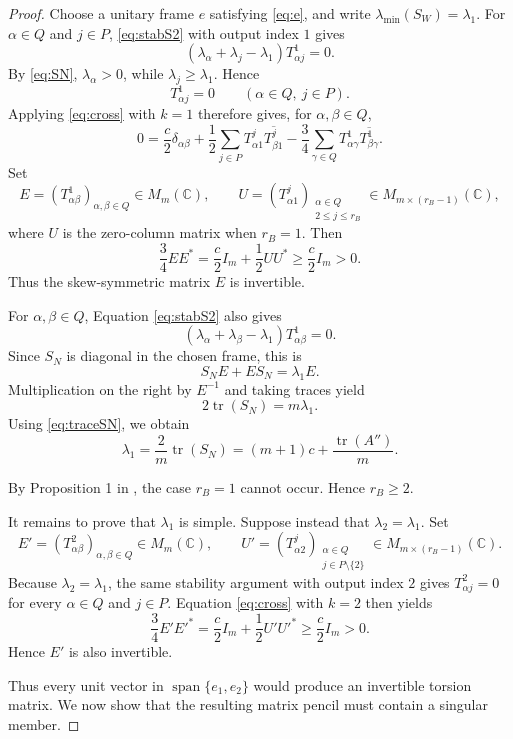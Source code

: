 \documentclass{amsart}
\newcommand{\C}{{\mathbb C}}
\begin{document}
\begin{proof}
Choose a unitary frame $e$ satisfying  \eqref{eq:e}, and write
$\lambda_{\min}(S_W)=\lambda_1$. For $\alpha\in Q$ and  $j\in P$,
\eqref{eq:stabS2} with output index $1$ gives
\[
 (\lambda_\alpha+\lambda_j-\lambda_1)T^1_{\alpha j}=0.
\]
By \eqref{eq:SN}, $\lambda_\alpha>0$, while
$\lambda_j\geq\lambda_1$. Hence
\begin{equation}\label{eq:lemma12-min-output}
 T^1_{\alpha j}=0
 \qquad(\alpha\in Q,\ j\in P).
\end{equation}
Applying \eqref{eq:cross}  with $k=1$   therefore gives, for
$\alpha,\beta\in Q$,
\[
 0=\frac{c}{2}\delta_{\alpha\beta}
   +\frac{1}{2}\sum_{j\in P}
      T^j_{\alpha1} \overline{T^j_{\beta1}}
   -\frac{3}{4}\sum_{\gamma\in Q}
      T^1_{\alpha\gamma} \overline{T^1_{\beta\gamma}}.
\]
  Set
\[
  E=(T^1_{\alpha\beta})_{\alpha,\beta\in Q}\in M_m(\C),
 \qquad
 U=(T^j_{\alpha1})_{ \substack{\alpha\in Q\\2\leq j\leq r_B} }
       \in M_{m\times(r_B-1)}(\C),
\]
  where $U$ is the zero-column matrix when $r_B=1$. Then
\[
 \frac{3}{4}EE^\ast
 =\frac{c}{2}I_m+\frac{1}{2}UU^\ast
 \geq\frac{c}{2}I_m>0.
\]
Thus  the skew-symmetric matrix $E$ is  invertible.

For $\alpha,\beta\in Q$, Equation \eqref{eq:stabS2} also gives
\[
 (\lambda_\alpha+\lambda_\beta-\lambda_1)
 T^1_{\alpha\beta}=0.
\]
Since $S_N$ is diagonal in the chosen frame, this is
\[
S_NE+ES_N=\lambda_1E.
\]
Multiplication on the right by $E^{-1}$ and taking traces yield
\[
2\operatorname{tr}(S_N)=m\lambda_1.
\]
Using \eqref{eq:traceSN}, we obtain
\[
\lambda_1
 =\frac{2}{m}\operatorname{tr}(S_N)
 =(m+1)c+\frac{\operatorname{tr}(A'')}{m}.
\]

By Proposition 1 in \cite{WZ}, the case $r_B=1$ cannot occur. Hence
$r_B\geq2$.

It remains to prove that $\lambda_1$ is simple. Suppose instead that
 $\lambda_2=\lambda_1$.  Set
\[
E'=(T^2_{\alpha\beta})_{\alpha,\beta\in Q}\in M_m(\C),
 \qquad
 U'=(T^j_{\alpha2})_{\substack{\alpha\in Q\\j\in P\setminus\{2\}}}
       \in M_{m\times(r_B-1)}(\C).
\]
Because $\lambda_2=\lambda_1$,  the   same stability argument with output
index $2$ gives $T^2_{\alpha j}=0$ for every $\alpha\in Q$ and
$j\in P$. Equation \eqref{eq:cross} with $k=2$ then yields
\[
\frac{3}{4}E'E'^\ast
 =\frac{c}{2}I_m+\frac{1}{2}U'U'^\ast
 \geq\frac{c}{2}I_m>0.
\]
Hence $E'$ is also invertible.


Thus every unit vector in $\operatorname{span}\{e_1,e_2\}$ would
produce an invertible torsion matrix. We now show that the resulting matrix
pencil must contain a singular member.



\end{proof}
\end{document}
